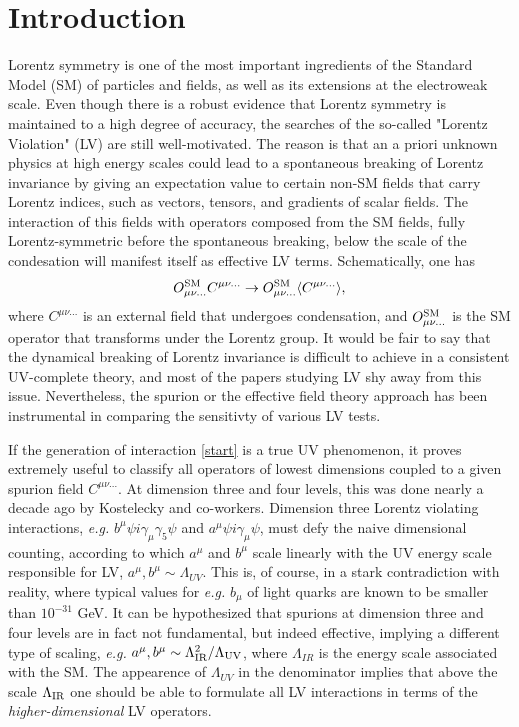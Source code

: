 \documentclass[12pt,preprintnumbers,nofootinbib]{revtex4}
\begin{document}
\section{Introduction}

	
	Lorentz symmetry is one of the most important ingredients of the 
	Standard Model (SM) of particles and fields, as well as its extensions at the 
electroweak scale. Even though there is a robust evidence that Lorentz symmetry is maintained to a 
high degree of accuracy, the searches of the so-called "Lorentz Violation" (LV) 
are still well-motivated. The reason is that an a priori unknown physics at high 
energy scales could lead to a spontaneous breaking of Lorentz invariance by 
giving an expectation value to certain non-SM fields 
that carry Lorentz indices, such as vectors, 
tensors, and gradients of scalar fields. The interaction of this fields with  operators composed 
from the SM fields, fully Lorentz-symmetric before the spontaneous breaking, below the 
scale of the condesation will manifest itself as effective LV terms. Schematically, one 
has 
\begin{equation}
O^{\rm SM}_{\mu\nu...} C^{\mu\nu...} \to O^{\rm SM}_{\mu\nu...} \langle C^{\mu\nu...} \rangle,
\label{start}
\end{equation}
where $C^{\mu\nu...}$ is an external field that undergoes condensation, and 
$O^{\rm SM}_{\mu\nu...} $ is the SM operator that transforms under 
the Lorentz group. It would be fair to say that the dynamical breaking of Lorentz 
invariance is difficult to achieve in a consistent UV-complete theory, and most of the 
papers studying LV shy away from this issue. 
 Nevertheless, the spurion or the effective field theory approach has been instrumental in 
comparing the sensitivty of various LV tests. 
	
If the generation of interaction \eqref{start} is a true UV phenomenon, it proves extremely useful 
to classify all operators of lowest dimensions coupled to a given spurion field $	C^{\mu\nu...}$.
At dimension three and four levels, this was done nearly a decade ago by Kostelecky and co-workers. 
Dimension three Lorentz violating interactions, {\em e.g.} $b^\mu \psi i\gamma_\mu\gamma_5\psi$ and 
 $a^\mu \psi i\gamma_\mu\psi$, must defy the naive dimensional counting, according to which $
 a^\mu$ and $b^\mu$ scale linearly with the UV energy scale responsible for LV, 
$a^\mu,b^\mu \sim \Lambda_{UV}$. This is, of course, in a stark contradiction with reality, 
where typical values for {\em e.g.} $b_\mu$ of light quarks are known to be smaller than 
$10^{-31}$ GeV. It can be hypothesized that spurions at dimension three and four levels are in fact 
not fundamental, but indeed effective, implying a different type of scaling, {\em e.g.} 
$a^\mu,b^\mu \sim \Lambda_{\rm IR}^2/\Lambda_{\rm UV}$, where $\Lambda_{IR}$ is the energy scale 
associated with the SM. The appearence of $\Lambda_{UV}$ in the denominator implies that above the 
scale $\Lambda_{\rm IR}$ one should be able to formulate all LV interactions in terms of the  
{\em higher-dimensional} LV operators.  
\end{document}
